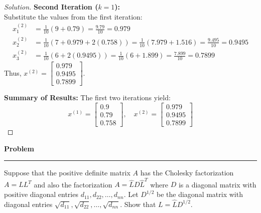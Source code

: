 \documentclass[11pt, a4paper]{article}
\newenvironment{problem}{%
  \begin{tcolorbox}[
    colback=blue!4!white,
    colframe=blue!38!black,
    boxrule=0.95pt,
    arc=3pt,
    left=11pt,
    right=11pt,
    top=10pt,
    bottom=11pt,
    before skip=12pt,
    after skip=14pt,
  ]
  \noindent\textbf{\textcolor{blue!35!black}{Problem}}\par\nointerlineskip
  {\color{blue!42!black}\rule{\linewidth}{0.55pt}}\par\vspace{0.55em}%
}{%
  \end{tcolorbox}%
}
\newif\ifsolutionnewpage
\newenvironment{solution}
  {\begin{proof}[Solution]}
  {\end{proof}\ifsolutionnewpage\newpage\fi}
\begin{document}
\begin{solution}
    \textbf{Second Iteration ($k=1$):} \\
    Substitute the values from the first iteration:
    \begin{align*}
        x_{1}^{(2)} &= \frac{1}{10} \left( 9 + 0.79 \right) = \frac{9.79}{10} = 0.979 \\[1ex]
        x_{2}^{(2)} &= \frac{1}{10} \left( 7 + 0.979 + 2(0.758) \right) = \frac{1}{10} \left( 7.979 + 1.516 \right) = \frac{9.495}{10} = 0.9495 \\[1ex]
        x_{3}^{(2)} &= \frac{1}{10} \left( 6 + 2(0.9495) \right) = \frac{1}{10} \left( 6 + 1.899 \right) = \frac{7.899}{10} = 0.7899
    \end{align*}
    Thus, $x^{(2)} = \begin{bmatrix} 0.979 \\ 0.9495 \\ 0.7899 \end{bmatrix}$.

    \textbf{Summary of Results:}
    The first two iterations yield:
    \[
    x^{(1)} = \begin{bmatrix} 0.9 \\ 0.79 \\ 0.758 \end{bmatrix}, \quad x^{(2)} = \begin{bmatrix} 0.979 \\ 0.9495 \\ 0.7899 \end{bmatrix}
    \]
\end{solution}



\begin{problem}
    Suppose that the positive definite matrix $A$ has the Cholesky factorization $A=LL^{T}$ and also the factorization $A=\hat{L}D\hat{L}^{T}$ where $D$ is a diagonal matrix with positive diagonal entries $d_{11},d_{22},\dots,d_{nn}$. Let $D^{1/2}$ be the diagonal matrix with diagonal entries $\sqrt{d_{11}},\sqrt{d_{22}},\dots,\sqrt{d_{nn}}$. Show that $L=\hat{L}D^{1/2}$.
\end{problem}
\end{document}
